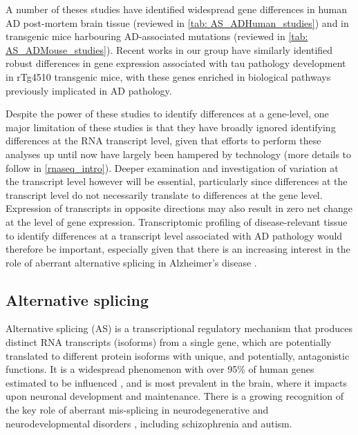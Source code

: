 A number of theses studies have identified widespread gene differences in human AD post-mortem brain tissue (reviewed in \cref{tab: AS_ADHuman_studies}) and in transgenic mice harbouring AD-associated mutations (reviewed in \cref{tab: AS_ADMouse_studies}). Recent works in our group have similarly identified robust differences in gene expression associated with tau pathology development in rTg4510 transgenic mice, with these genes enriched in biological pathways previously implicated in AD pathology\cite{Castanho2020}. 

Despite the power of these studies to identify differences at a gene-level, one major limitation of these studies is that they have broadly ignored identifying differences at the RNA transcript level, given that efforts to perform these analyses up until now have largely been hampered by technology (more details to follow in \cref{rnaseq_intro}). Deeper examination and investigation of variation at the transcript level however will be essential, particularly since differences at the transcript level do not necessarily translate to differences at the gene level. Expression of transcripts in opposite directions may also result in zero net change at the level of gene expression. Transcriptomic profiling of disease-relevant tissue to identify differences at a transcript level associated with AD pathology would therefore be important, especially given that there is an increasing interest in the role of aberrant alternative splicing in Alzheimer's disease \cite{Raj2018}.

\subsection{Alternative splicing}\label{intro:AS}
Alternative splicing (AS) is a transcriptional regulatory mechanism that produces distinct RNA transcripts (isoforms) from a single gene, which are potentially translated to different protein isoforms with unique, and potentially, antagonistic functions\cite{Wang2008}. It is a widespread phenomenon with over 95\% of human genes estimated to be influenced \cite{Pan2008}, and is most prevalent in the brain\cite{Yeo2004}, where it impacts upon neuronal development and maintenance\cite{Pan2008, Mazin2014, Raj2015}. There is a growing recognition of the key role of aberrant mis-splicing in neurodegenerative and neurodevelopmental disorders \cite{Gandal2018,RL2019}, including schizophrenia and autism. 

